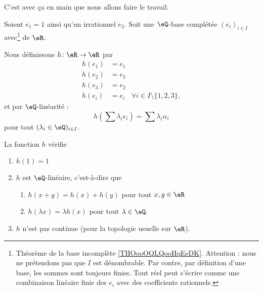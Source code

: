 C'est avec ça en main que nous allons faire le travail.

\begin{proposition}
	Soient \( e_1=1\) ainsi qu'un irrationnel \( e_2\). Soit une \( \eQ\)-base complétée \( (e_i)_{i\in I}\) avec\footnote{Théorème de la base incomplète \ref{THOooOQLQooHqEeDK}. Attention : nous ne prétendons pas que \( I\) est dénombrable. Par contre, par définition d'une base, les sommes sont toujours finies. Tout réel peut s'écrire comme une combinaison linéaire finie des \( e_i\) avec des coefficients rationnels.} de \( \eR\).

	Nous définissons \( h\colon \eR\to \eR\) par
	\begin{subequations}
		\begin{align}
			h(e_1) & =e_1                                       \\
			h(e_2) & =e_3                                       \\
			h(e_3) & =e_2                                       \\
			h(e_i) & =e_i & \forall i\in I\setminus\{ 1,2,3 \},
		\end{align}
	\end{subequations}
	et par \( \eQ\)-linéarité :
	\begin{equation}
		h(\sum \lambda_i e_i) = \sum \lambda_i \alpha_i
	\end{equation}
	pour tout \( (\lambda_i\in \eQ)_{i\in I}\).

	La fonction \( h\) vérifie
	\begin{enumerate}
		\item       \label{ITEMooOXXMooJFSuuN}
		      \( h(1)=1\)
		\item
		      \( h\) est \( \eQ\)-linéaire, c'est-à-dire que
		      \begin{enumerate}
			      \item   \label{ITEMooAVNMooEsodLR}
			            \( h(x+y)=h(x)+h(y)\) pour tout \( x,y\in \eR\)
			      \item       \label{ITEMooDEJMooXtvrgi}
			            \( h(\lambda x)=\lambda h(x)\) pour tout \( \lambda\in \eQ\).
		      \end{enumerate}
		\item       \label{ITEMooMHNZooBHQywD}
		      \( h\) n'est pas continue (pour la topologie usuelle sur \( \eR\)).
	\end{enumerate}
\end{proposition}

